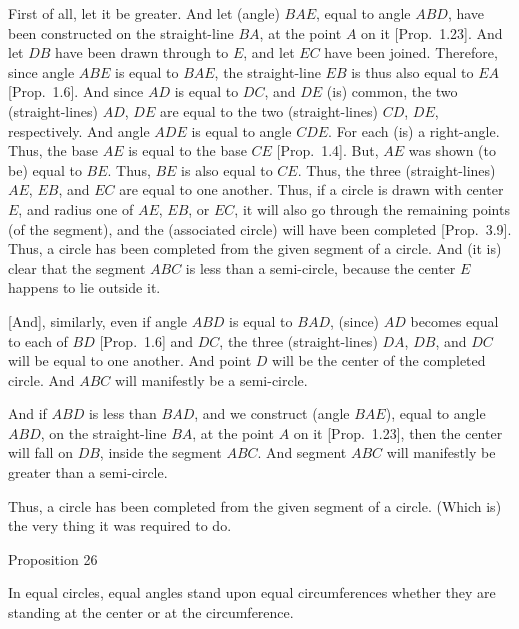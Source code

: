 First of all, let it be greater. And let (angle) $BAE$, equal to
angle $ABD$, have been constructed on the straight-line $BA$, at the point $A$ on it [Prop.~1.23].
And let $DB$ have been drawn through to $E$, and let $EC$ have been joined.
Therefore, since angle $ABE$ is equal to $BAE$, the straight-line $EB$ is thus also
equal to $EA$ [Prop.~1.6]. And since $AD$ is equal to $DC$, and $DE$ (is)
common, the two (straight-lines) $AD$, $DE$ are equal to the two (straight-lines)
$CD$, $DE$, respectively. And angle $ADE$ is equal to angle $CDE$. For each (is)
a right-angle. Thus, the base $AE$ is equal to the base $CE$ [Prop.~1.4].
But, $AE$ was shown (to be) equal to $BE$. Thus, $BE$ is also equal
to $CE$. Thus, the three (straight-lines) $AE$, $EB$, and $EC$ are equal to
one another. Thus, if a circle is drawn with center $E$, and radius one of $AE$, $EB$, or $EC$,  it will also go through the remaining points (of the segment), and the (associated circle) will have been
 completed [Prop.~3.9]. Thus, a circle has been completed from the given
 segment of a circle. And (it is) clear that the segment $ABC$ is less
 than a semi-circle, because the center $E$ happens to lie outside it.
 
\mbox{[}And], similarly, even if angle $ABD$ is equal to $BAD$,  (since) $AD$ becomes equal to
 each of $BD$ [Prop.~1.6] and $DC$, the three (straight-lines) $DA$, $DB$, and $DC$
 will  be equal to one another. And point $D$ will be the center of the completed
 circle. And $ABC$ will manifestly be a semi-circle.
 
 And if $ABD$ is less than $BAD$, and we construct (angle $BAE$), equal to angle
 $ABD$,  on the straight-line $BA$, at the point $A$ on it [Prop.~1.23], then
 the center will fall on $DB$,  inside the segment $ABC$. And segment
 $ABC$ will manifestly be greater than a semi-circle.
 
 Thus, a circle has been completed from the given segment of a circle. (Which is) the very thing it was required to do.


\begin{center}
{\large Proposition 26}
\end{center}

In equal circles, equal angles stand upon equal circumferences  whether they
are standing at the center or at the circumference.

\epsfysize=1.5in
\centerline{}

